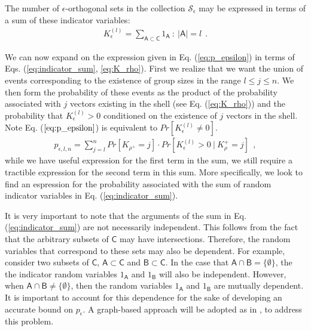 The number of $\epsilon$-orthogonal sets in the collection $\mathscr{S}_\epsilon$ may be expressed in terms of a sum of these indicator variables:
 \begin{equation}\label{eq:indicator_sum}
    \begin{aligned}
        K_\epsilon^{(l)} = \sum_{\mathsf{A}\subset\mathsf{C}}1_{\mathsf{A}} \ : \ \vert \mathsf{A} \vert = l \ \ .
    \end{aligned}
\end{equation}

We can now expand on the expression given in Eq. (\ref{eq:p_epsilon}) in terms of Eqs. (\ref{eq:indicator_sum}, \ref{eq:K_rho}). First we realize that we want the union of events corresponding to the existence of group sizes in the range $l\leq j \leq n$. We then form the probability of these events as the product of the probability associated with $j$ vectors existing in the shell (see Eq. (\ref{eq:K_rho})) and the probability that $K_\epsilon^{(l)} > 0$ conditioned on the existence of $j$ vectors in the shell. Note Eq.   ($\ref{eq:p_epsilon}$) is equivalent to $Pr[ K_\epsilon^{(l)} \neq 0]$.
 \begin{equation}\label{eq:p_epsilon_sum}
    \begin{aligned}
        p_{\epsilon,l,n} = \sum_{j=l}^n Pr[K_{\rho^+} = j] \cdot Pr[ K_\epsilon^{(l)} >0 \ \vert \ K_\rho^+ = j] \ \ ,
    \end{aligned}
\end{equation}
while we have useful expression for the first term in the sum, we still require a tractible expression for the second term in this sum. More specifically, we look to find an espression for the probability associated with the sum of random indicator variables in Eq. (\ref{eq:indicator_sum}).

It is very important to note that the arguments of the sum in Eq. (\ref{eq:indicator_sum}) are not necessarily independent. This follows from the fact that the arbitrary subsets of $\mathsf{C}$ may have intersections. Therefore, the random variables that correspond to these sets may also be dependent. For example, consider two subsets of $\mathsf{C}$, $\mathsf{A}\subset\mathsf{C}$ and $\mathsf{B}\subset\mathsf{C}$. In the case that $\mathsf{A}\cap\mathsf{B} = \lbrace \emptyset \rbrace$, the the indicator random variables $1_{\mathsf{A}}$ and $1_\mathsf{B}$ will also be independent. However, when $\mathsf{A}\cap\mathsf{B} \neq \lbrace \emptyset \rbrace$, then the random variables $1_{\mathsf{A}}$ and $1_\mathsf{B}$ are mutually dependent. It is important to account for this dependence for the sake of developing an accurate bound on $p_\epsilon$. A graph-based approach will be adopted as in \cite{Swannack2005}, \cite{Janson2004} to address this problem.